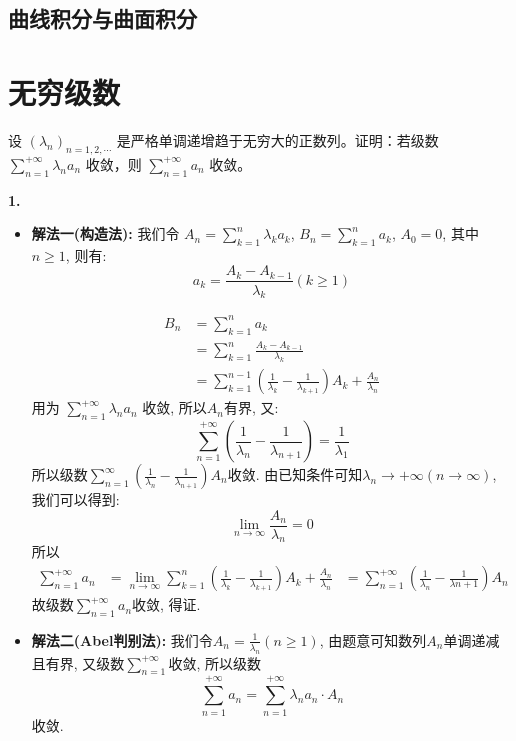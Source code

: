 \documentclass[12pt]{article}
\newenvironment{solution}[2][Solution]{\begin{trivlist}
\item[\hskip \labelsep {\bfseries #1}]}{\end{trivlist}}
\newenvironment{problem}[2][Problem]{\begin{trivlist}
\item[\hskip \labelsep {\bfseries #1}\hskip \labelsep {\bfseries #2.}]}{\end{trivlist}}
\begin{document}
\subsection{曲线积分与曲面积分}


\section{无穷级数}

\begin{problem}{1}
设 $(\lambda_n)_{n=1,2,\cdots}$ 是严格单调递增趋于无穷大的正数列。证明：若级数 $\displaystyle{ \sum_{n=1}^{+\infty}}\lambda_n a_n$ 收敛，则 $\displaystyle{\sum_{n=1}^{+\infty}}a_n$ 收敛。
\end{problem}

\begin{solution}{1} \textbf{1.}

\begin{itemize}  

	\item \textbf{解法一(构造法):} 我们令 $\displaystyle{A_n=\sum_{k=1}^{n}\lambda_k a_k}$, $\displaystyle{B_n = \sum_{k=1}^{n}a_k}$, $A_0=0$, 其中$n\geq1$, 则有:
\[
a_k = \frac{A_k - A_{k-1}}{\lambda_k} (k\geq1)
\]

\[
\begin{aligned}
B_n &= \sum_{k=1}^{n}a_k \\
&= \sum_{k=1}^{n} \frac{A_k - A_{k-1}}{\lambda_k}\\
&= \sum_{k=1}^{n-1} (\frac{1}{\lambda_k}-\frac{1}{\lambda_{k+1}}) A_k + \frac{A_n}{\lambda_n}
\end{aligned}
\]
用为 $\displaystyle{\sum_{n=1}^{+\infty}} \lambda_n a_n$ 收敛, 所以$A_n$有界, 又:
\[
\sum_{n=1}^{+\infty}(\frac{1}{\lambda_n} - \frac{1}{\lambda_{n+1}}) = \frac{1}{\lambda_1}
\]
所以级数$\displaystyle{\sum_{n=1}^{\infty}}(\frac{1}{\lambda_n} - \frac{1}{\lambda_{n+1}})A_n$收敛. 由已知条件可知$\lambda_n \to +\infty(n\to\infty)$, 我们可以得到:
\[
\lim_{n\to\infty} \frac{A_n}{\lambda_n} = 0
\]
所以
\[
\begin{aligned}
\sum_{n=1}^{+\infty} a_n 
&= \lim_{n\to\infty} \sum_{k=1}^{n} (\frac{1}{\lambda_k}-\frac{1}{\lambda_{k+1}})A_k+\frac{A_n}{\lambda_n}
&= \sum_{n=1}^{+\infty} (\frac{1}{\lambda_n} - \frac{1}{\lambda{n+1}})A_n
\end{aligned}
\]
故级数$\displaystyle{\sum_{n=1}^{+\infty}}a_n$收敛, 得证.



	\item \textbf{解法二(Abel判别法):} 我们令$A_n = \frac{1}{\lambda_n}(n\geq1)$, 由题意可知数列$A_n$单调递减且有界, 又级数$\displaystyle{\sum_{n=1}^{+\infty}}$收敛, 所以级数
\[
\sum_{n=1}^{+\infty}a_n = \sum_{n=1}^{+\infty}\lambda_n a_n \cdot{} A_n
\]
收敛.

\end{itemize}
\end{solution}
\end{document}
